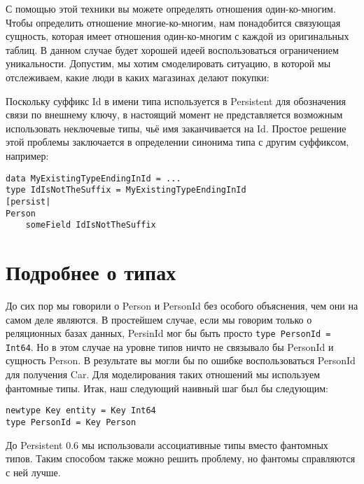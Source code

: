 
С помощью этой техники вы можете определять отношения один-ко-многим. Чтобы определить отношение многие-ко-многим, нам понадобится связующая сущность, которая имеет отношения один-ко-многим с каждой из оригинальных таблиц. В данном случае будет хорошей идеей воспользоваться ограничением уникальности. Допустим, мы хотим смоделировать ситуацию, в которой мы отслеживаем, какие люди в каких магазинах делают покупки:


\begin{remark}
Поскольку суффикс Id в имени типа используется в Persistent для обозначения связи по внешнему ключу, в настоящий момент не представляется возможным использовать неключевые типы, чьё имя заканчивается на Id. Простое решение этой проблемы заключается в определении синонима типа с другим суффиксом, например:

\begin{lstlisting}
data MyExistingTypeEndingInId = ...
type IdIsNotTheSuffix = MyExistingTypeEndingInId
[persist|
Person
    someField IdIsNotTheSuffix
\end{lstlisting}
\end{remark}

\section{Подробнее о типах}

До сих пор мы говорили о Person и PersonId без особого объяснения, чем они на самом деле являются. В простейшем случае, если мы говорим только о реляционных базах данных, PersinId мог бы быть просто \lstinline'type PersonId = Int64'. Но в этом случае на уровне типов ничто не связывало бы PersonId и сущность Person. В результате вы могли бы по ошибке воспользоваться PersonId для получения Car. Для моделирования таких отношений мы используем фантомные типы. Итак, наш следующий наивный шаг был бы следующим:

\begin{lstlisting}
newtype Key entity = Key Int64
type PersonId = Key Person
\end{lstlisting}

\begin{remark}
До Persistent 0.6 мы использовали ассоциативные типы вместо фантомных типов. Таким способом также можно решить проблему, но фантомы справляются с ней лучше.
\end{remark}

